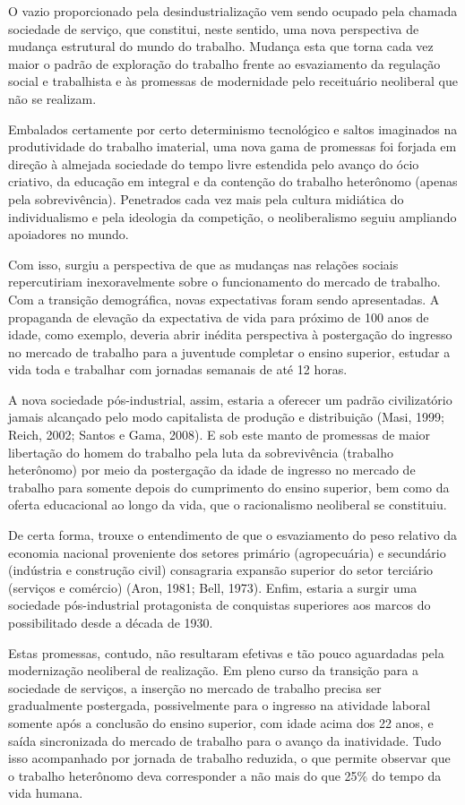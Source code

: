 O vazio proporcionado pela desindustrialização vem sendo ocupado pela
chamada sociedade de serviço, que constitui, neste sentido, uma nova
perspectiva de mudança estrutural do mundo do trabalho. Mudança esta que
torna cada vez maior o padrão de exploração do trabalho frente ao
esvaziamento da regulação social e trabalhista e às promessas de
modernidade pelo receituário neoliberal que não se realizam.

Embalados certamente por certo determinismo tecnológico e saltos
imaginados na produtividade do trabalho imaterial, uma nova gama de
promessas foi forjada em direção à almejada sociedade do tempo livre
estendida pelo avanço do ócio criativo, da educação em integral e da
contenção do trabalho heterônomo (apenas pela sobrevivência). Penetrados
cada vez mais pela cultura midiática do individualismo e pela ideologia
da competição, o neoliberalismo seguiu ampliando apoiadores no mundo.

Com isso, surgiu a perspectiva de que as mudanças nas relações sociais
repercutiriam inexoravelmente sobre o funcionamento do mercado de
trabalho. Com a transição demográfica, novas expectativas foram sendo
apresentadas. A propaganda de elevação da expectativa de vida para
próximo de 100 anos de idade, como exemplo, deveria abrir inédita
perspectiva à postergação do ingresso no mercado de trabalho para a
juventude completar o ensino superior, estudar a vida toda e trabalhar
com jornadas semanais de até 12 horas.

A nova sociedade pós-industrial, assim, estaria a oferecer um padrão
civilizatório jamais alcançado pelo modo capitalista de produção e
distribuição (Masi, 1999; Reich, 2002; Santos e Gama, 2008). E sob este
manto de promessas de maior libertação do homem do trabalho pela luta da
sobrevivência (trabalho heterônomo) por meio da postergação da idade de
ingresso no mercado de trabalho para somente depois do cumprimento do
ensino superior, bem como da oferta educacional ao longo da vida, que o
racionalismo neoliberal se constituiu.

De certa forma, trouxe o entendimento de que o esvaziamento do peso
relativo da economia nacional proveniente dos setores primário
(agropecuária) e secundário (indústria e construção civil) consagraria
expansão superior do setor terciário (serviços e comércio) (Aron, 1981;
Bell, 1973). Enfim, estaria a surgir uma sociedade pós-industrial
protagonista de conquistas superiores aos marcos do possibilitado desde
a década de 1930.

Estas promessas, contudo, não resultaram efetivas e tão pouco aguardadas
pela modernização neoliberal de realização. Em pleno curso da transição
para a sociedade de serviços, a inserção no mercado de trabalho precisa
ser gradualmente postergada, possivelmente para o ingresso na atividade
laboral somente após a conclusão do ensino superior, com idade acima dos
22 anos, e saída sincronizada do mercado de trabalho para o avanço da
inatividade. Tudo isso acompanhado por jornada de trabalho reduzida, o
que permite observar que o trabalho heterônomo deva corresponder a não
mais do que 25\% do tempo da vida humana.

